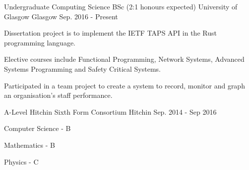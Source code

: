 

\begin{cventries}

  \cventry
    {Undergraduate Computing Science BSc (2:1 honours expected)} %
    {University of Glasgow} %
    {Glasgow} %
    {Sep. 2016 - Present} %
    {
      \begin{cvitems} %
        \item {Dissertation project is to implement the IETF TAPS API in the Rust programming language.}
	\item {Elective courses include Functional Programming, Network Systems, Advanced Systems Programming and Safety Critical Systems.}
	\item {Participated in a team project to create a system to record, monitor and graph an organisation's staff performance.}
      \end{cvitems}
    }
  \cventry
    {A-Level}
    {Hitchin Sixth Form Consortium}
    {Hitchin}
    {Sep. 2014 - Sep 2016}
    {
      \begin{cvitems}
        \item{Computer Science - B}
	\item{Mathematics - B}
	\item{Physics - C}
      \end{cvitems}
    }
\end{cventries}
